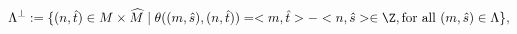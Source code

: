 \begin{equation}\label{dual}
\Lambda^\perp:=\{(n,\hat t)\in M\times \widehat{M}\mid
\theta((m,\hat s),(n,\hat t))=<m, \hat t>-<n, \hat s> \in{\Z},
\text{for all }(m,\hat s)\in \Lambda\},
\end{equation}

